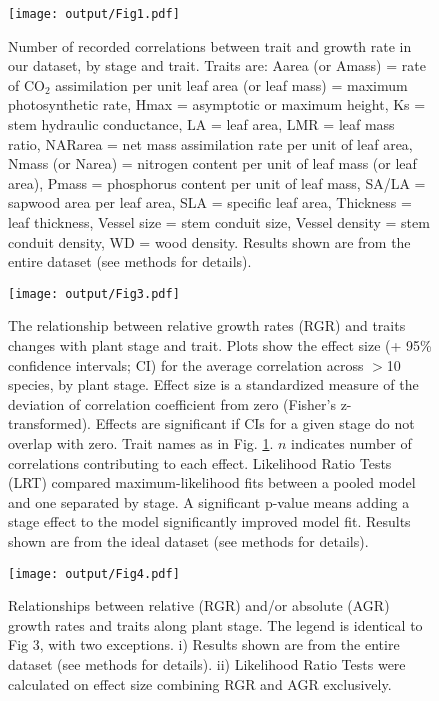 \documentclass[a4paper,11pt]{article}
\begin{document}
\begin{figure}[h!]
\centering
\texttt{[image: output/Fig1.pdf]}
\caption{Number of recorded correlations between trait and growth rate in our dataset, by stage and trait. Traits are: Aarea (or Amass) = rate of CO$_{2}$ assimilation per unit leaf area (or leaf mass) = maximum photosynthetic rate, Hmax = asymptotic or maximum height,  Ks = stem hydraulic conductance, LA = leaf area, LMR = leaf mass ratio, NARarea = net mass assimilation rate per unit of leaf area, Nmass (or Narea) = nitrogen content per unit of leaf mass (or leaf area), Pmass = phosphorus content per unit of leaf mass, SA/LA = sapwood area per leaf area, SLA = specific leaf area, Thickness = leaf thickness, Vessel size = stem conduit size, Vessel density = stem conduit density, WD = wood density. Results shown are from the entire dataset (see methods for details).}
\label{fig:fig1}
\end{figure}

\begin{figure}[h!]
\centering
\texttt{[image: output/Fig3.pdf]}
\caption{The relationship between relative growth rates (RGR) and traits changes with plant stage and trait. Plots show the effect size (+ 95\% confidence intervals; CI) for the average correlation across $>$10 species, by plant stage. Effect size is a standardized measure of the deviation of correlation coefficient from zero (Fisher's z-transformed). Effects are significant if CIs for a given stage do not overlap with zero. Trait names as in Fig. \ref{fig:fig1}. $n$ indicates number of correlations contributing to each effect. Likelihood Ratio Tests (LRT) compared maximum-likelihood fits between a pooled model and one separated by stage. A significant p-value means adding a stage effect to the model significantly improved model fit. Results shown are from the ideal dataset (see methods for details).}
\label{fig:fig3}
\end{figure}

\begin{figure}[h!]
\centering
\texttt{[image: output/Fig4.pdf]}
\caption{Relationships between relative (RGR) and/or absolute (AGR) growth rates and traits along plant stage. The legend is identical to Fig 3, with two exceptions. i) Results shown are from the entire dataset (see methods for details). ii) Likelihood Ratio Tests were calculated on effect size combining RGR and AGR exclusively.}
\label{fig:fig4}
\end{figure}
\end{document}
